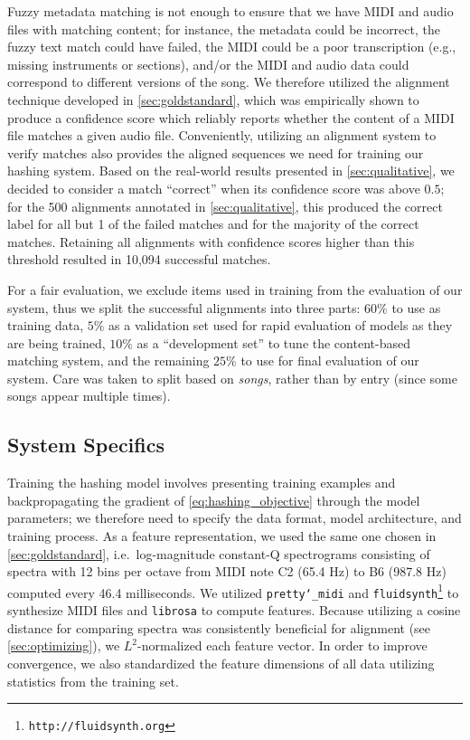 Fuzzy metadata matching is not enough to ensure that we have MIDI and audio files with matching content; for instance, the metadata could be incorrect, the fuzzy text match could have failed, the MIDI could be a poor transcription (e.g., missing instruments or sections), and/or the MIDI and audio data could correspond to different versions of the song.
We therefore utilized the alignment technique developed in \cref{sec:goldstandard}, which was empirically shown to produce a confidence score which reliably reports whether the content of a MIDI file matches a given audio file.
Conveniently, utilizing an alignment system to verify matches also provides the aligned sequences we need for training our hashing system.
Based on the real-world results presented in \cref{sec:qualitative}, we decided to consider a match ``correct'' when its confidence score was above $0.5$; for the 500 alignments annotated in \cref{sec:qualitative}, this produced the correct label for all but 1 of the failed matches and for the majority of the correct matches.
Retaining all alignments with confidence scores higher than this threshold resulted in 10,094 successful matches.

For a fair evaluation, we exclude items used in training from the evaluation of our system, thus we split the successful alignments into three parts: $60\%$ to use as training data, $5\%$ as a validation set used for rapid evaluation of models as they are being trained, $10\%$ as a ``development set'' to tune the content-based matching system, and the remaining $25\%$ to use for final evaluation of our system.
Care was taken to split based on \textit{songs}, rather than by entry (since some songs appear multiple times).

\subsection{System Specifics}
\label{sec:hashing_system}

Training the hashing model involves presenting training examples and backpropagating the gradient of \cref{eq:hashing_objective} through the model parameters; we therefore need to specify the data format, model architecture, and training process.
As a feature representation, we used the same one chosen in \cref{sec:goldstandard}, i.e.\ log-magnitude constant-Q spectrograms consisting of spectra with 12 bins per octave from MIDI note C2 (65.4 Hz) to B6 (987.8 Hz) computed every 46.4 milliseconds.
We utilized \texttt{pretty\char`_midi} \cite{raffel2014pretty_midi} and \texttt{fluidsynth}\footnote{\texttt{http://fluidsynth.org}} to synthesize MIDI files and \texttt{librosa} \cite{mcfee2015librosa, mcfee2015librosa_scipy} to compute features.
Because utilizing a cosine distance for comparing spectra was consistently beneficial for alignment (see \cref{sec:optimizing}), we $L^2$-normalized each feature vector.
In order to improve convergence, we also standardized the feature dimensions of all data utilizing statistics from the training set.

